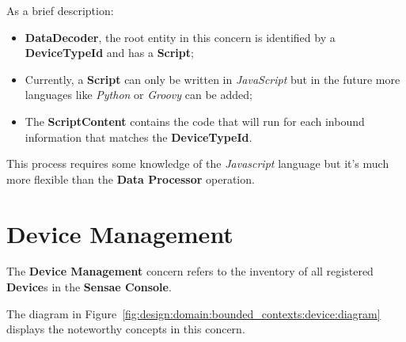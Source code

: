 As a brief description:

\begin{itemize}
   \item \textbf{DataDecoder}, the root entity in this concern is identified by a \textbf{DeviceTypeId} and has a \textbf{Script};
   \item Currently, a \textbf{Script} can only be written in \textit{JavaScript} but in the future more languages like \textit{Python} or \textit{Groovy} can be added;
   \item The \textbf{ScriptContent} contains the code that will run for each inbound information that matches the \textbf{DeviceTypeId}.
\end{itemize}

This process requires some knowledge of the \textit{Javascript} language but it's much more flexible than the \textbf{Data Processor} operation.

\section{Device Management}
\label{subsubsec:design:domain:bounded_contexts:device}

The \textbf{Device Management} concern refers to the inventory of all registered \textbf{Device}s in the \textbf{Sensae Console}.

The diagram in Figure~\ref{fig:design:domain:bounded_contexts:device:diagram} displays the noteworthy concepts in this concern.

